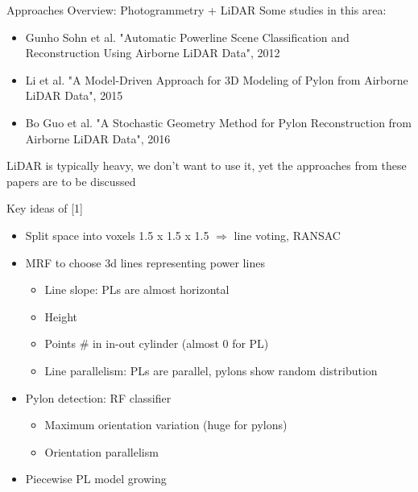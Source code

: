 \documentclass{beamer}
\begin{document}
\begin{frame}[t, fragile]{Approaches Overview: Photogrammetry + LiDAR}
Some studies in this area:
\begin{itemize}
\item [1] Gunho Sohn et al. "Automatic Powerline Scene Classification and Reconstruction Using Airborne LiDAR Data", 2012 
\item [2] Li et al. "A Model-Driven Approach for 3D Modeling of Pylon from Airborne LiDAR Data", 2015
\item [3] Bo Guo et al. "A Stochastic Geometry Method for Pylon
Reconstruction from Airborne LiDAR Data", 2016
\end{itemize}

LiDAR is typically heavy, we don't want to use it, yet the approaches from these papers are to be discussed

\end{frame}

\begin{frame}[t, fragile]{Key ideas of [1]}
\begin{itemize}
\item Split space into voxels 1.5 x 1.5 x 1.5 $\Rightarrow$ line voting, RANSAC
\item MRF to choose 3d lines representing power lines
\begin{itemize}
\item Line slope: PLs are almost horizontal
\item Height
\item Points \# in in-out cylinder (almost 0 for PL)
\item Line parallelism: PLs are parallel, pylons show random distribution
\end{itemize}
\item Pylon detection: RF classifier
\begin{itemize}
\item Maximum orientation variation (huge for pylons)
\item Orientation parallelism
\end{itemize}
\item Piecewise PL model growing
\end{itemize}
\end{frame}
\end{document}
